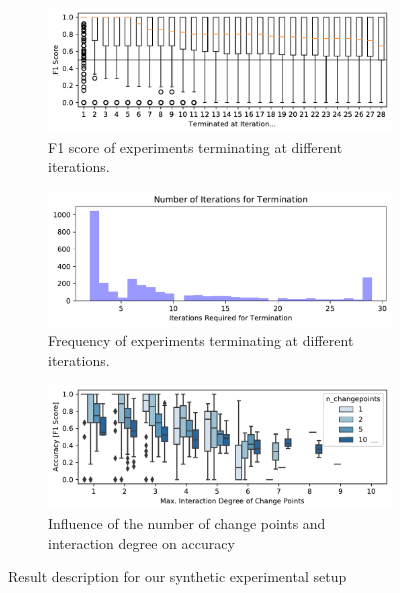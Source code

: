 \documentclass[sigconf]{acmart}
\begin{document}
	\begin{figure}
		\begin{subfigure}{\linewidth}
			\centering
			\includegraphics[width=\linewidth]{images/accuracy_after_termination.pdf}
			\caption{F1 score of experiments terminating at different iterations.}	
			\label{fig:results_rq1_accuracy_terminated}
		\end{subfigure}
		\begin{subfigure}{\linewidth}
			\centering
			\includegraphics[width=\linewidth]{images/iterations_for_termination.pdf}
			\caption{Frequency of experiments terminating at different iterations.}	
			\label{fig:results_rq1_frequency}
		\end{subfigure}
		\begin{subfigure}{\linewidth}
			\centering
			\includegraphics[width=\linewidth]{images/max_degree_after_termination}
			\caption{Influence of the number of change points and interaction degree on accuracy}	
			\label{fig:results_rq1_degree}
		\end{subfigure}
		\caption{Result description for our synthetic experimental setup}
		\label{fig:results_rq1:results_rq1_degree}
	\end{figure} 
	
\end{document}
